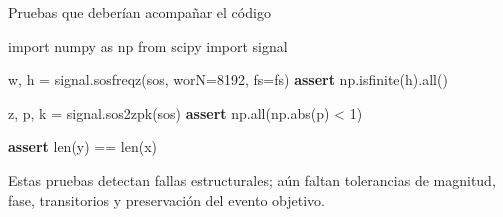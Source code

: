 \documentclass[
  ignorenonframetext,
  aspectratio=169,
  spanish,
  professionalfonts]{beamer}
\newenvironment{Shaded}{\begin{snugshade}}{\end{snugshade}}
\newcommand{\BuiltInTok}[1]{\textcolor[rgb]{0.00,0.23,0.31}{#1}}
\newcommand{\ControlFlowTok}[1]{\textcolor[rgb]{0.00,0.23,0.31}{\textbf{#1}}}
\newcommand{\DecValTok}[1]{\textcolor[rgb]{0.68,0.00,0.00}{#1}}
\newcommand{\ImportTok}[1]{\textcolor[rgb]{0.00,0.46,0.62}{#1}}
\newcommand{\NormalTok}[1]{\textcolor[rgb]{0.00,0.23,0.31}{#1}}
\newcommand{\OperatorTok}[1]{\textcolor[rgb]{0.37,0.37,0.37}{#1}}
\begin{document}
\begin{frame}[fragile]{Pruebas que deberían acompañar el código}
\protect{}\label{pruebas-que-deberuxedan-acompauxf1ar-el-cuxf3digo}
\begin{Shaded}
\begin{Highlighting}[]
\ImportTok{import}\NormalTok{ numpy }\ImportTok{as}\NormalTok{ np}
\ImportTok{from}\NormalTok{ scipy }\ImportTok{import}\NormalTok{ signal}

\NormalTok{w, h }\OperatorTok{=}\NormalTok{ signal.sosfreqz(sos, worN}\OperatorTok{=}\DecValTok{8192}\NormalTok{, fs}\OperatorTok{=}\NormalTok{fs)}
\ControlFlowTok{assert}\NormalTok{ np.isfinite(h).}\BuiltInTok{all}\NormalTok{()}

\NormalTok{z, p, k }\OperatorTok{=}\NormalTok{ signal.sos2zpk(sos)}
\ControlFlowTok{assert}\NormalTok{ np.}\BuiltInTok{all}\NormalTok{(np.}\BuiltInTok{abs}\NormalTok{(p) }\OperatorTok{\textless{}} \DecValTok{1}\NormalTok{)}

\ControlFlowTok{assert} \BuiltInTok{len}\NormalTok{(y) }\OperatorTok{==} \BuiltInTok{len}\NormalTok{(x)}
\end{Highlighting}
\end{Shaded}

\begin{tcolorbox}[enhanced jigsaw, arc=.35mm, bottomrule=.15mm, bottomtitle=1mm, breakable, colback=white, colbacktitle=quarto-callout-warning-color!10!white, colframe=quarto-callout-warning-color-frame, coltitle=black, left=2mm, leftrule=.75mm, opacityback=0, opacitybacktitle=0.6, rightrule=.15mm, title={Alcance de las pruebas}, titlerule=0mm, toprule=.15mm, toptitle=1mm]

Estas pruebas detectan fallas estructurales; aún faltan tolerancias de
magnitud, fase, transitorios y preservación del evento objetivo.

\end{tcolorbox}
\end{frame}
\end{document}
